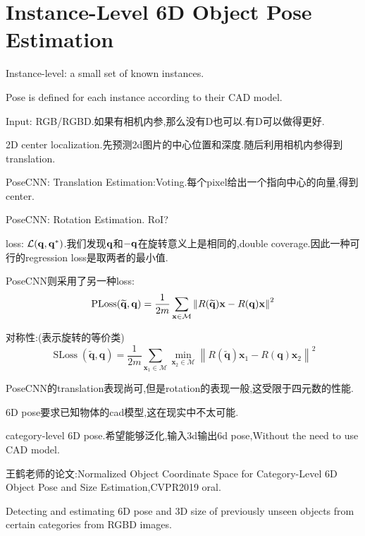\section{Instance-Level 6D Object Pose Estimation}

Instance-level: a small set of known instances.

Pose is defined for each instance according to their CAD model.

Input: RGB/RGBD.如果有相机内参,那么没有D也可以.有D可以做得更好.

2D center localization.先预测2d图片的中心位置和深度.随后利用相机内参得到translation.

PoseCNN: Translation Estimation:Voting.每个pixel给出一个指向中心的向量,得到center.

PoseCNN: Rotation Estimation. RoI?

loss: $\mathcal{L}(\bold{q}, \bold{q}^{*})$.我们发现$\bold{q}$和$-\bold{q}$在旋转意义上是相同的,double coverage.因此一种可行的regression loss是取两者的最小值.

PoseCNN则采用了另一种loss:
\begin{equation}
   \mathrm{PLoss}(\widetilde{\bold{q}}, \bold{q}) = \frac{1}{2m}\sum_{\bold{x} \in \mathcal{M}} \left \Vert R(\widetilde{\bold{q}}) \bold{x} - R(\bold{q}) \bold{x} \right \Vert^2
\end{equation}

对称性:(表示旋转的等价类)
\begin{equation}
   \operatorname{SLoss}(\widetilde{\mathbf{q}}, \mathbf{q})=\frac{1}{2 m} \sum_{\mathbf{x}_{1} \in \mathcal{M}} \min _{\mathbf{x}_{2} \in \mathcal{M}}\left\|R(\tilde{\mathbf{q}}) \mathbf{x}_{1}-R(\mathbf{q}) \mathbf{x}_{2}\right\|^{2}
\end{equation}

PoseCNN的translation表现尚可,但是rotation的表现一般,这受限于四元数的性能.

6D pose要求已知物体的cad模型,这在现实中不太可能.

category-level 6D pose.希望能够泛化,输入3d输出6d pose,Without the need to use CAD model.

王鹤老师的论文:Normalized Object Coordinate Space for Category-Level 6D Object Pose and Size Estimation,CVPR2019 oral.

Detecting and estimating 6D pose and 3D size of previously unseen objects from certain categories from RGBD images.

